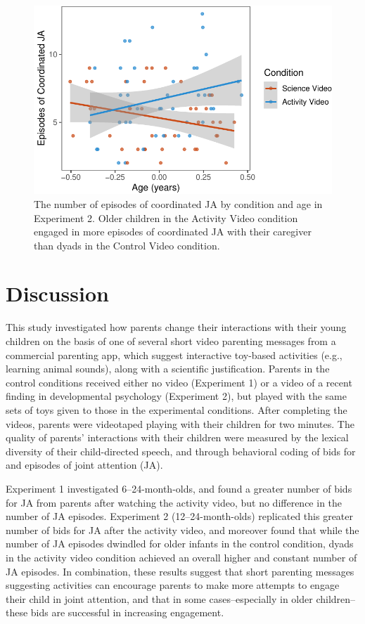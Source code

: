 \documentclass[man,floatsintext]{apa6}
\begin{document}
\begin{figure}[H]

{\centering \includegraphics{figs/e2ja-coord-1} 

}

\caption{The number of episodes of coordinated JA by condition and age in Experiment 2. Older children in the Activity Video condition engaged in more episodes of coordinated JA with their caregiver than dyads in the Control Video condition.}\label{fig:e2ja-coord}
\end{figure}

\hypertarget{discussion-1}{%
\section{Discussion}\label{discussion-1}}

This study investigated how parents change their interactions with their young children on the basis of one of several short video parenting messages from a commercial parenting app, which suggest interactive toy-based activities (e.g., learning animal sounds), along with a scientific justification.
Parents in the control conditions received either no video (Experiment 1) or a video of a recent finding in developmental psychology (Experiment 2), but played with the same sets of toys given to those in the experimental conditions.
After completing the videos, parents were videotaped playing with their children for two minutes.
The quality of parents' interactions with their children were measured by the lexical diversity of their child-directed speech, and through behavioral coding of bids for and episodes of joint attention (JA).

Experiment 1 investigated 6--24-month-olds, and found a greater number of bids for JA from parents after watching the activity video, but no difference in the number of JA episodes.
Experiment 2 (12--24-month-olds) replicated this greater number of bids for JA after the activity video, and moreover found that while the number of JA episodes dwindled for older infants in the control condition, dyads in the activity video condition achieved an overall higher and constant number of JA episodes.
In combination, these results suggest that short parenting messages suggesting activities can encourage parents to make more attempts to engage their child in joint attention, and that in some cases--especially in older children--these bids are successful in increasing engagement.
\end{document}
